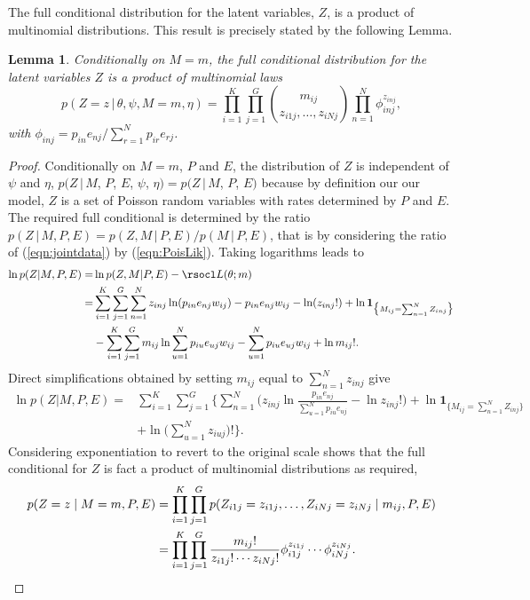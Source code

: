 \documentclass[11pt]{amsart}
\newtheorem{lemma}{Lemma}
\theoremstyle{definition}
\theoremstyle{remark}
\begin{document}
The full conditional distribution for the latent variables, $Z$, is a
product of multinomial distributions. This result is precisely stated
by the following Lemma. 

\begin{lemma}\label{lem:Full_for_Z} Conditionally on  $M= m$, the full
  conditional distribution for the latent variables $Z$ is a  product
  of multinomial laws 
\[
   p(Z = z\,|\, \theta, \psi, M=m, \eta)
   = 
   \prod_{i=1}^K\prod_{j=1}^G {m_{ij} \choose z_{i1j}, \ldots,
     z_{iNj}} 
   \prod_{n=1}^N \phi_{inj}^{z_{inj}},
\]
with $\phi_{inj} = p_{in} e_{nj}/\sum_{r=1}^N p_{ir}e_{rj}$.
\end{lemma}

\begin{proof} 
Conditionally on $M = m$, $P$ and $E$, the distribution of $Z$ is
independent of $\psi$ and $\eta$, $p(Z\,|\, M$, $P$, $E$, $\psi$,
$\eta) = p(Z\,|\, M$, $P$, $E)$ because by definition our our model,
$Z$ is a set of Poisson random variables with rates determined by $P$
and $E$. The required full conditional is determined by the ratio
$p(Z\,|\,M, P, E) = p(Z, M\,|\, P,E)/p(M\,|\,P, E)$, that is by
considering the ratio of (\ref{eqn:jointdata}) by
(\ref{eqn:PoisLik}). Taking logarithms leads to
\begin{align*}
    \ln p(Z|M, P, E) 
  =&
    \ln p(Z, M|P, E) - \rsocl L(\theta; m) \\
  =&
    \sum_{i=1}^K \sum_{j=1}^G \sum_{n=1}^N z_{inj}
     \ln(p_{in}e_{nj}w_{ij}) - 
     p_{in}e_{nj}w_{ij} - \ln(z_{inj}!) +\ln \mathbf{1}_{\big\{M_{ij} =
     \sum_{n=1}^N Z_{inj}\big\}} \\ 
    & -\sum_{i=1}^K \sum_{j=1}^G m_{ij}\ln \sum_{u=1}^N
      p_{iu}e_{uj}w_{ij} - 
      \sum_{u=1}^N p_{iu}e_{uj}w_{ij} + \ln m_{ij}!.
\end{align*}
Direct simplifications obtained by  setting $m_{ij}$ equal to
$\sum_{n=1}^N  z_{inj}$ give
\begin{align*}
    \ln p(Z|M, P, E) 
  =&
    \sum_{i=1}^K \sum_{j=1}^G\Big\{
       \sum_{n=1}^N \Big(
           z_{inj} \ln\frac{p_{in}e_{nj}}{\sum_{u=1}^N
           p_{iu}e_{uj}} - \ln z_{inj}!
       \Big) + 
       \ln \mathbf{1}_{\big\{M_{ij} = \sum_{n=1}^N Z_{inj}
     \big\}} \\
     &+ \ln \big(\sum_{u=1}^N z_{iuj}\big)!
   \Big\}.
\end{align*}
Considering exponentiation to revert to the original scale shows that
the full conditional for $Z$ is fact a product of multinomial
distributions as required,
\begin{align}
       p(Z = z\mid M = m, P, E) 
     &= 
       \prod_{i=1}^K \prod_{j=1}^G
       p(Z_{i1j} = z_{i1j}, \ldots, Z_{iNj} =
       z_{iNj}\mid m_{ij}, P, E) \notag\\ 
     &=
       \prod_{i=1}^K \prod_{j=1}^G
       \frac{m_{ij}!}{z_{i1j}!\cdots z_{iNj}!}
        \phi_{i1j}^{z_{i1j}} \cdots
       \phi_{iNj}^{z_{iNj}}. \notag\qedhere
\end{align}
\end{proof}
\end{document}
